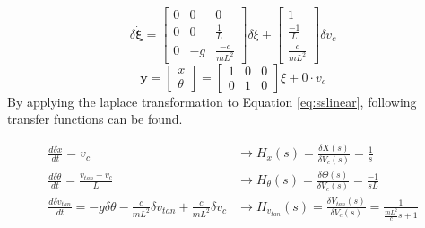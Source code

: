 \documentclass[a4paper,kul]{kulakarticle} %
\begin{document}
	\begin{equation}
	\label{eq:sslinear}
	\delta\mathbf{\dot{\xi}} = \begin{bmatrix}
	0&0&0\\0&0&\frac{1}{L}\\0&-g&\frac{-c}{mL^2}
	\end{bmatrix} \delta\xi + \begin{bmatrix}
	1\\\frac{-1}{L}\\\frac{c}{mL^2}
	\end{bmatrix} \delta v_c
	\end{equation}
	\begin{equation}
	\mathbf{y} 
	= \begin{bmatrix}
	x\\\theta
	\end{bmatrix} = \begin{bmatrix}
	1&0&0\\0&1&0
	\end{bmatrix}\xi + 0 \cdot v_c
	\label{eq:measurementlinear}
\end{equation}
By applying the laplace transformation to Equation \ref{eq:sslinear}, following transfer functions can be found. 

\begin{equation}
\begin{split}
\frac{d\delta x}{dt} = v_c &\rightarrow H_x(s) = \frac{\delta X(s)}{\delta V_c(s)} = \frac{1}{s}\\
\frac{d\delta \theta}{dt} = \frac{v_{tan}-v_c}{L} &\rightarrow H_{\theta}(s) = \frac{\delta \Theta(s)}{\delta V_c(s)} = \frac{-1}{sL}\\
\frac{d\delta v_{tan}}{dt} = -g\delta\theta - \frac{c}{mL^2}\delta v_{tan} +  \frac{c}{mL^2} \delta v_c &\rightarrow H_{v_{tan}}(s) = \frac{\delta V_{tan}(s)}{\delta V_c(s)} = \frac{1}{\frac{mL^2}{c}s+1}
\end{split}
\end{equation}
\end{document}
